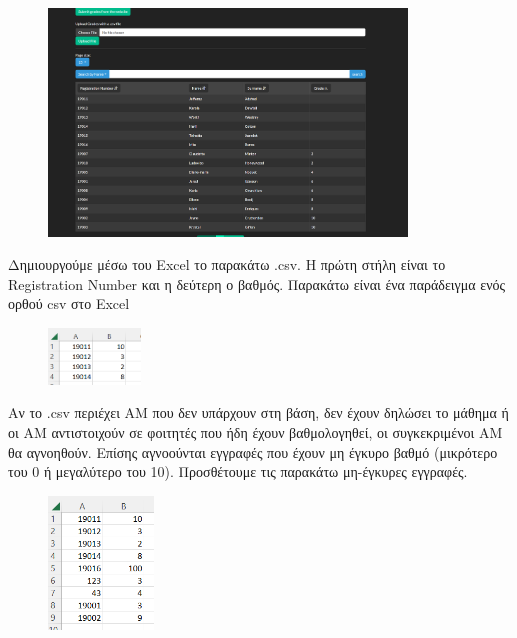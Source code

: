 \documentclass[12pt]{article}
\begin{document}
	\begin{figure}[H]
	\centering
	\includegraphics[width=0.85\textwidth]{mymy.png}
	\caption{}
	\label{fig:emptyView}
	\end{figure}

	Δημιουργούμε μέσω του Excel το παρακάτω .csv. Η πρώτη στήλη είναι το Registration Number και η δεύτερη ο βαθμός. Παρακάτω είναι ένα παράδειγμα ενός ορθού csv στο Excel
	
	\begin{figure}[H]
		\centering
		\includegraphics[width=0.22\textwidth]{correct.png}
		\caption{}
		\label{fig:emptyView}
	\end{figure}
	
	Αν το .csv περιέχει ΑΜ που δεν υπάρχουν στη βάση, δεν έχουν δηλώσει το μάθημα ή οι ΑΜ αντιστοιχούν σε φοιτητές που ήδη έχουν βαθμολογηθεί, οι συγκεκριμένοι ΑΜ θα αγνοηθούν. Επίσης αγνοούνται εγγραφές που έχουν μη έγκυρο βαθμό  (μικρότερο του 0 ή μεγαλύτερο του 10). Προσθέτουμε τις παρακάτω μη-έγκυρες εγγραφές.
	
	\begin{figure}[H]
		\centering
		\includegraphics[width=0.25\textwidth]{wrong.png}
		\caption{}
		\label{fig:emptyView}
	\end{figure}
	
\end{document}
